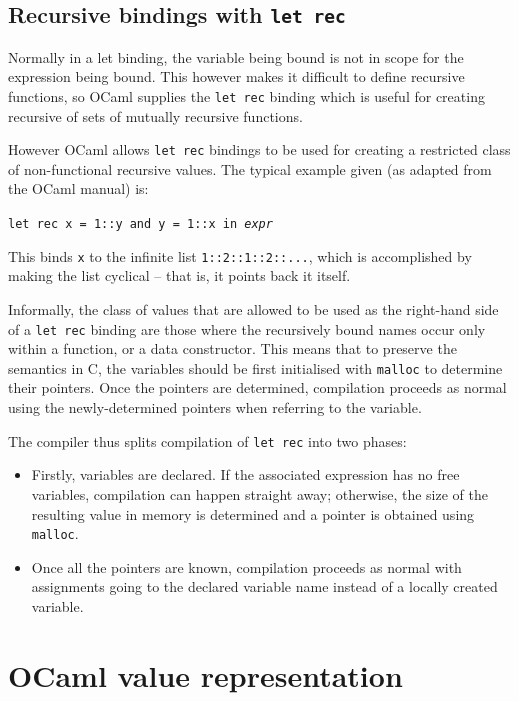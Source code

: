 \documentclass[12pt,a4paper,twoside,openright]{report}
\begin{document}
\subsection{Recursive bindings with \texttt{let rec}}

Normally in a let binding, the variable being bound is not in scope for the 
expression being bound. This however makes it difficult to define recursive 
functions, so OCaml supplies the \texttt{let rec} binding which is useful for 
creating recursive of sets of mutually recursive functions.

However OCaml allows \texttt{let rec} bindings to be used for creating a 
restricted class of non-functional recursive values. The typical example given 
(as adapted from the OCaml manual) is:

\begin{center}
    \texttt{let rec x = 1::y and y = 1::x in \emph{expr}}
\end{center}

This binds \texttt{x} to the infinite list \texttt{1::2::1::2::...}, which is 
accomplished by making the list cyclical -- that is, it points back it itself.

Informally, the class of values that are allowed to be used as the right-hand 
side of a \texttt{let rec} binding are those where the recursively bound names 
occur only within a function, or a data constructor. This means that to 
preserve the semantics in C, the variables should be first initialised with 
\texttt{malloc} to determine their pointers. Once the pointers are determined, 
compilation proceeds as normal using the newly-determined pointers when 
referring to the variable.

The compiler thus splits compilation of \texttt{let rec} into two phases:

\begin{itemize}
    \item Firstly, variables are declared. If the associated expression has no 
    free variables, compilation can happen straight away; otherwise, the size 
    of the resulting value in memory is determined and a pointer is obtained 
    using \texttt{malloc}.
    
    \item Once all the pointers are known, compilation proceeds as normal with 
    assignments going to the declared variable name instead of a locally 
    created variable.
\end{itemize}

\section{OCaml value representation} \label{value-repr}
\end{document}
